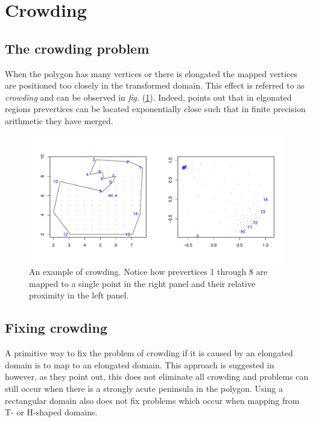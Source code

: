 \documentclass[a4paper,10pt]{amsart}
\newcommand{\fig}[1]{\emph{fig.} (\ref{#1})}
\begin{document}
\section{Crowding}

\subsection{The crowding problem}
When the polygon has many vertices or there is elongated the mapped vertices are positioned too closely in the transformed domain. This effect is referred to as \emph{crowding} and can be observed in \fig{crowdeddisk}. Indeed, \cite{howell90} points out that in elgonated regions prevertices can be located exponentially close such that in finite precision arithmetic they have merged.

\begin{figure} [tbp]
\centering
\includegraphics[scale=0.5]{figs/crowdeddisk.pdf}
\caption{An example of crowding. Notice how prevertices 1 through 8 are mapped to a single point in the right panel and their relative proximity in the left panel.}
\label{crowdeddisk}
\end{figure}

\subsection{Fixing crowding}

A primitive way to fix the problem of crowding if it is caused by an elongated domain is to map to an elongated domain. This approach is suggested in \cite{howell90} however, as they point out, this does not eliminate all crowding and problems can still occur when there is a strongly acute peninsula in the polygon. Using a rectangular domain also does not fix problems which occur when mapping from T- or H-shaped domains.
\end{document}
